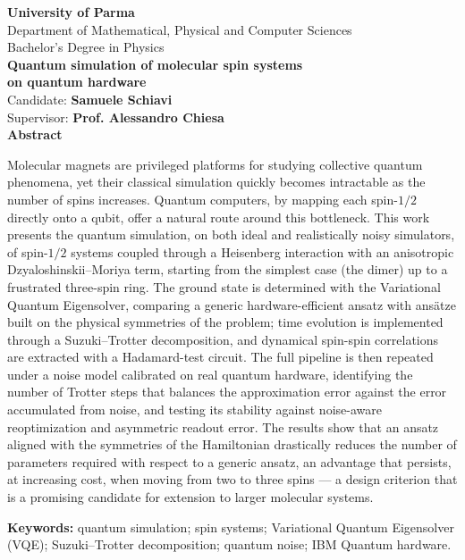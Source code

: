 \documentclass[11pt,a4paper]{article}
\begin{document}
\begin{center}
{\large\bfseries University of Parma}\\[2pt]
{\normalsize Department of Mathematical, Physical and Computer Sciences}\\[4pt]
{\normalsize Bachelor's Degree in Physics}\\[18pt]

{\Large\bfseries Quantum simulation of molecular spin systems\\ on quantum hardware}\\[18pt]

{\normalsize Candidate: \textbf{Samuele Schiavi}}\\[4pt]
{\normalsize Supervisor: \textbf{Prof. Alessandro Chiesa}}\\[18pt]
{\normalsize\bfseries Abstract}
\end{center}

\vspace{6pt}
\onehalfspacing
\noindent
Molecular magnets are privileged platforms for studying collective quantum
phenomena, yet their classical simulation quickly becomes intractable as the
number of spins increases. Quantum computers, by mapping each spin-$1/2$
directly onto a qubit, offer a natural route around this bottleneck. This
work presents the quantum simulation, on both ideal and realistically noisy
simulators, of spin-$1/2$ systems coupled through a Heisenberg interaction
with an anisotropic Dzyaloshinskii--Moriya term, starting from the simplest
case (the dimer) up to a frustrated three-spin ring. The ground state is
determined with the Variational Quantum Eigensolver, comparing a generic
hardware-efficient ansatz with ans\"atze built on the physical symmetries of
the problem; time evolution is implemented through a Suzuki--Trotter
decomposition, and dynamical spin-spin correlations are extracted with a
Hadamard-test circuit. The full pipeline is then repeated under a noise
model calibrated on real quantum hardware, identifying the number of
Trotter steps that balances the approximation error against the error
accumulated from noise, and testing its stability against noise-aware
reoptimization and asymmetric readout error. The results show that an
ansatz aligned with the symmetries of the Hamiltonian drastically reduces
the number of parameters required with respect to a generic ansatz, an
advantage that persists, at increasing cost, when moving from two to three
spins --- a design criterion that is a promising candidate for extension to
larger molecular systems.

\vspace{12pt}
\noindent\textbf{Keywords:} quantum simulation; spin systems; Variational
Quantum Eigensolver (VQE); Suzuki--Trotter decomposition; quantum noise;
IBM Quantum hardware.
\end{document}
